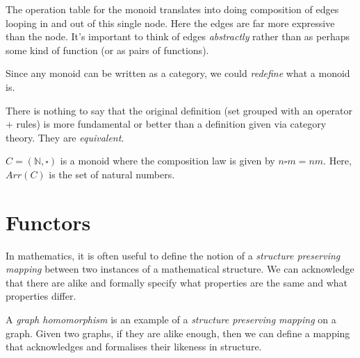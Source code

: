 \frmrule

The operation table for the monoid translates into 
doing composition of edges looping in and out of this single node. 
Here the edges are far more expressive than the node. 
It's important to think of edges \textit{abstractly} rather than 
as perhaps some kind of function (or as pairs of functions). 

Since any monoid can be written as a category, 
we could \textit{redefine} what a monoid is. 


There is nothing to say that the original definition 
(set grouped with an operator + rules) is more 
fundamental or better than a definition given via category theory. 
They are \textit{equivalent}. 

\frmrule


\begin{example}
$C = (\mathbb{N}, \square)$ is a monoid where the composition law is given by $n \square m = nm$.
Here, $Arr(C)$ is the set of natural numbers. 
\end{example}

\frmrule





\frmrule


\section{Functors}

In mathematics, it is often useful to define the notion of 
a \textit{structure preserving mapping} 
between two instances of a mathematical structure. 
We can acknowledge that there are alike and formally specify 
what properties are the same and what properties differ. 

A \textit{graph homomorphism} is an example 
of a \textit{structure preserving mapping} on a graph. 
Given two graphs, if they are alike enough, 
then we can define a mapping that acknowledges and formalises their 
likeness in structure.


